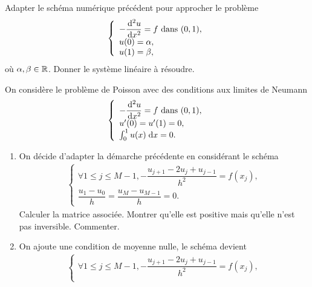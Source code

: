 \documentclass[12pt,a4paper,twoside]{article}
\begin{document}
\begin{exercise}
  Adapter le sch\'ema num\'erique pr\'ec\'edent pour approcher
  le probl\`eme
  \begin{align*}
    \left\{
    \begin{array}{l}
      - \dfrac{\!\;\mathrm{d}^2 u}{\!\;\mathrm{d} x^2} = f \text{ dans } (0,1) ,
      \\
      u(0) = \alpha ,
      \\
      u(1) = \beta ,
    \end{array}
    \right.
  \end{align*}
  o\`u $\alpha, \beta \in \mathbb{R}$.
  Donner le syst\`eme lin\'eaire \`a r\'esoudre.
\end{exercise}

\begin{exercise}
  On consid\`ere le probl\`eme de Poisson avec des conditions aux limites
  de Neumann 
  \begin{align*}
    \left\{
    \begin{array}{l}
      - \dfrac{\!\;\mathrm{d}^2 u}{\!\;\mathrm{d} x^2} = f \text{ dans } (0,1) ,
      \\
      u'(0) = u'(1) = 0 ,
      \\
      \int_0^1 u(x) \;\mathrm{d} x = 0 .
    \end{array}
  \right.
  \end{align*}
  \begin{enumerate}
  \item On d\'ecide d'adapter la d\'emarche pr\'ec\'edente en consid\'erant le sch\'ema
    \begin{align*}
      \left\{
      \begin{array}{l}
        \forall 1 \leq j \leq M-1 , - \dfrac{u_{j+1} - 2 u_j + u_{j-1}}{h^2} = f(x_j) ,
        \\
        \dfrac{u_1 - u_0}{h} = \dfrac{u_M - u_{M-1}}{h} = 0.
      \end{array}
      \right.
    \end{align*}
    Calculer la matrice associ\'ee. Montrer qu'elle est positive 
    mais qu'elle n'est pas inversible. Commenter.
  \item On ajoute une condition de moyenne nulle, le sch\'ema devient
    \begin{align*}
      \left\{
      \begin{array}{l}
        \forall 1 \leq j \leq M-1 , - \dfrac{u_{j+1} - 2 u_j + u_{j-1}}{h^2} = f(x_j) ,
        \\

\end{array}
\end{align*}
\end{enumerate}
\end{exercise}
\end{document}

